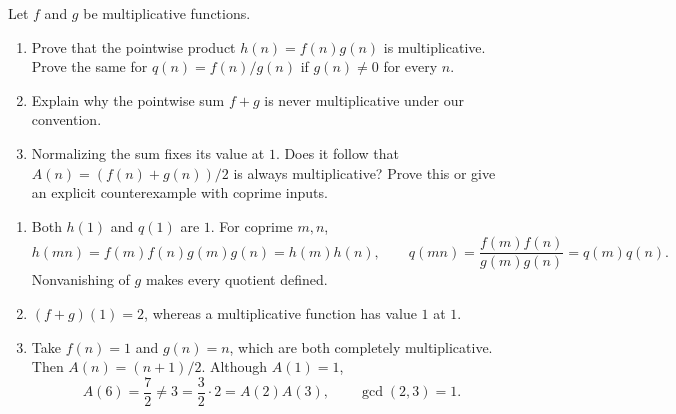 \instructorbreak
{}
Let $f$ and $g$ be multiplicative functions.
\begin{enumerate}
  \item Prove that the pointwise product $h(n)=f(n)g(n)$ is
  multiplicative. Prove the same for $q(n)=f(n)/g(n)$ if $g(n)\ne0$
  for every $n$. 
  \item Explain why the pointwise sum $f+g$ is never multiplicative
  under our convention. 
  \item Normalizing the sum fixes its value at $1$. Does it follow that
  $A(n)=(f(n)+g(n))/2$ is always multiplicative? Prove this or give
  an explicit counterexample with coprime inputs. 
\end{enumerate}
\begin{solution}
\begin{enumerate}
  \item Both $h(1)$ and $q(1)$ are $1$. For coprime $m,n$,
  \[
    h(mn)=f(m)f(n)g(m)g(n)=h(m)h(n),
    \qquad
    q(mn)=\frac{f(m)f(n)}{g(m)g(n)}=q(m)q(n).
  \]
  Nonvanishing of $g$ makes every quotient defined.
  \item $(f+g)(1)=2$, whereas a multiplicative function has value $1$
  at $1$.
  \item Take $f(n)=1$ and $g(n)=n$, which are both completely
  multiplicative. Then $A(n)=(n+1)/2$. Although $A(1)=1$,
  \[
    A(6)=\frac72\ne3=\frac32\cdot2=A(2)A(3),
    \qquad\gcd(2,3)=1.
  \]
\end{enumerate}
\end{solution}

